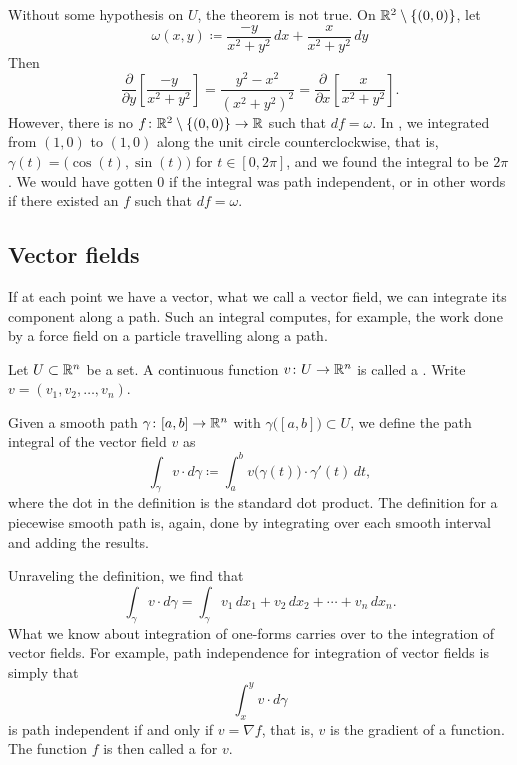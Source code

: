 \begin{example}
Without some hypothesis on $U$, the theorem is not true.
On ${\mathbb{R}}^2 \setminus \{ (0,0) \}$, let
\begin{equation*}
\omega(x,y) \coloneqq \frac{-y}{x^2+y^2} \,dx + \frac{x}{x^2+y^2} \,dy
\end{equation*}
Then
\begin{equation*}
\frac{\partial}{\partial y} \left[ 
\frac{-y}{x^2+y^2} \right] =
\frac{y^2-x^2}{{(x^2+y^2)}^2}
=
\frac{\partial}{\partial x} \left[ 
\frac{x}{x^2+y^2} \right] .
\end{equation*}
However, there is no $f \colon {\mathbb{R}}^2 \setminus \{ (0,0) \} \to {\mathbb{R}}$ such that 
$df = \omega$.  In
,
we integrated from $(1,0)$ to $(1,0)$
along the unit circle counterclockwise,
that is, $\gamma(t) = \bigl(\cos(t),\sin(t)\bigr)$
for $t \in [0,2\pi]$, and we found the integral to be $2\pi$.  We would have
gotten $0$ if
the integral was path independent,
or in other words if there existed an $f$ such that
$df = \omega$.
\end{example}

\subsection{Vector fields}

If at each point we have a vector, what we call a vector field,
we can integrate its component along a path.
Such an integral computes, for example, the work done by a force field
on a particle travelling along a path.

\begin{defn}
Let $U \subset {\mathbb{R}}^n$ be a set.
A continuous function $v \colon U \to {\mathbb{R}}^n$ is called a
\emph{}.  Write $v = (v_1,v_2,\ldots,v_n)$.

Given a smooth path $\gamma \colon [a,b] \to {\mathbb{R}}^n$ with
$\gamma\bigl([a,b]\bigr) \subset U$, we define
the path integral of the vector field $v$ as
\begin{equation*}
\int_{\gamma} v \cdot d\gamma
\coloneqq
\int_a^b v\bigl(\gamma(t)\bigr) \cdot \gamma'(t) \, dt ,
\end{equation*}
where the dot in the definition is the standard dot product.
The definition for a piecewise smooth path is, again, done by integrating over
each smooth interval and adding the results.
\end{defn}

Unraveling the definition, we find that
\begin{equation*}
\int_{\gamma} v \cdot d\gamma
=
\int_{\gamma} v_1 \,dx_1 + v_2 \,dx_2 + \cdots + v_n \,dx_n .
\end{equation*}
What we know about integration of
one-forms carries over to the integration of vector fields.
For example, path independence for integration of vector fields is simply
that
\begin{equation*}
\int_x^y v \cdot d\gamma
\end{equation*}
is path independent if and only if 
$v = \nabla f$, that is, $v$ is the gradient of a function.  The function $f$
is then called a \emph{} for $v$.

